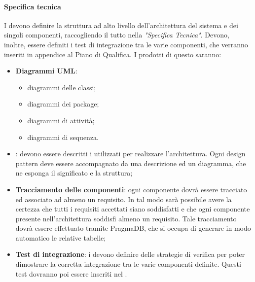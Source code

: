  \paragraph{Specifica tecnica}\label{Specifica tecnica}
 I \PJP{} devono definire la struttura ad alto livello dell'architettura del sistema e dei singoli
componenti, raccogliendo il tutto nella \textit{"Specifica Tecnica"}. Devono, inoltre, essere definiti i test di
integrazione tra le varie componenti, che verranno inseriti in appendice al Piano di Qualifica.
I prodotti di questo  saranno:
 \begin{itemize}
 	\item \textbf{Diagrammi UML}:
 	\begin{itemize}
 		\item diagrammi delle classi;
 		\item diagrammi dei package;
 		\item diagrammi di attività;
 		\item diagrammi di sequenza.
 	\end{itemize}
 	\item \textbf{}: devono essere descritti i  utilizzati per realizzare l'architettura. Ogni design
 	pattern deve essere accompagnato da una descrizione ed un diagramma, che ne esponga il
 	significato e la struttura;
 	\item \textbf{Tracciamento delle componenti}: ogni componente dovrà essere tracciato ed associato
 	ad almeno un requisito. In tal modo sarà possibile avere la certezza che tutti i requisiti
 	accettati siano soddisfatti e che ogni componente presente nell’architettura soddisfi almeno
 	un requisito. Tale tracciamento dovrà essere effettuato tramite PragmaDB, che si occupa
 	di generare in modo automatico le relative tabelle;
 	\item \textbf{Test di integrazione}: i \PJP{} devono definire delle strategie di verifica per poter dimostrare la corretta integrazione tra le varie componenti definite. Questi test dovranno poi essere inseriti nel .
 \end{itemize}
